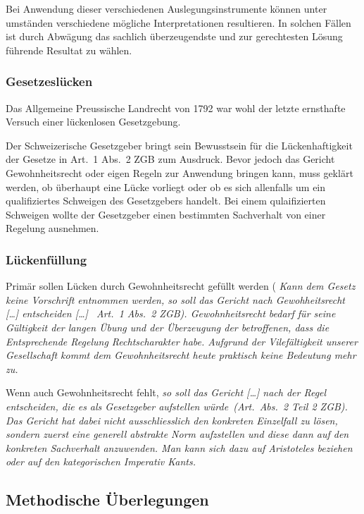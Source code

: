 Bei Anwendung dieser verschiedenen Auslegungsinstrumente können unter
umständen verschiedene mögliche Interpretationen resultieren. In solchen
Fällen ist durch Abwägung das sachlich überzeugendste und zur
gerechtesten Lösung führende Resultat zu wählen\autocite[\S\ 4 N.\
59]{riemer_einleitungsartikel}.

\subsubsection{Gesetzeslücken}
Das Allgemeine Preussische Landrecht von 1792 war wohl der letzte
ernsthafte Versuch einer lückenlosen Gesetzgebung\autocite[Seite
332]{wieacker}.

Der Schweizerische Gesetzgeber bringt sein Bewusstsein für die
Lücken\-haftigkeit der Gesetze in Art.\ 1 Abs.\ 2 ZGB zum Ausdruck. Bevor
jedoch das Gericht Gewohnheitsrecht oder eigen Regeln zur Anwendung
bringen kann, muss geklärt werden, ob überhaupt eine Lücke vorliegt oder
ob es sich allenfalls um ein qualifiziertes Schweigen des Gesetzgebers
handelt. Bei einem qulaifizierten Schweigen wollte der Gesetzgeber einen
bestimmten Sachverhalt von einer Regelung ausnehmen\autocite[\S\ 4 N.\
88]{riemer_einleitungsartikel}.

\subsubsection{Lückenfüllung}
Primär sollen Lücken durch Gewohnheitsrecht gefüllt werden (\itshape
\flqq Kann dem Gesetz keine Vorschrift entnommen werden, so soll das
Gericht nach Gewohheitsrecht [\ldots] entscheiden [\ldots]\frqq
\normalfont\ Art.\ 1 Abs.\ 2 ZGB). Gewohnheitsrecht bedarf für seine
Gültigkeit der langen Übung und der Überzeugung der betroffenen, dass
die Entsprechende Regelung Rechtscharakter habe\autocite[N.\
418]{bk_zgb1}. Aufgrund der Vilefältigkeit unserer Gesellschaft kommt
dem Gewohnheitsrecht heute praktisch keine Bedeutung mehr
zu\autocites[N.\ 431]{bk_zgb1}[\S\ 4 N.\
125]{riemer_einleitungsartikel}[Seite 40]{tuor_schnyder}.

Wenn auch Gewohnheitsrecht fehlt, \itshape so soll das Gericht [\ldots]
nach der Regel entscheiden, die es als Gesetzgeber aufstellen
würde\normalfont\ (Art.\ Abs.\ 2 Teil 2 ZGB). Das Gericht hat dabei
nicht ausschliesslich den konkreten Einzelfall zu lösen, sondern zuerst
eine generell abstrakte Norm aufzstellen und diese dann auf den
konkreten Sachverhalt anzuwenden\autocite[\S\ 4 N.\
130]{riemer_einleitungsartikel}. Man kann sich dazu auf Aristoteles
beziehen\autocite[Seite 42]{tuor_schnyder} oder auf den kategorischen
Imperativ Kants\autocite[Seite 421, Zeilen 7 -- 8]{gms}.


\subsection{Methodische Überlegungen}
